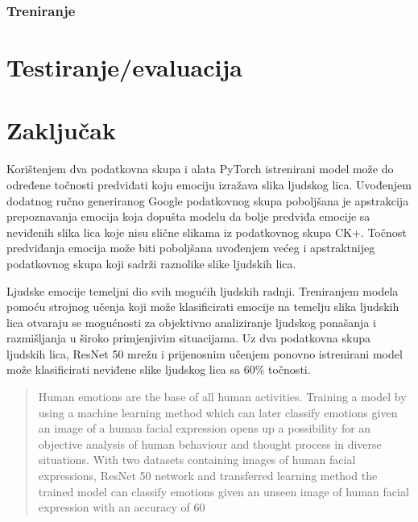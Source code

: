 \documentclass[times, utf8, zavrsni,numeric,pstricks]{fer}
\begin{document}
\subsection{Treniranje}

\chapter{Testiranje/evaluacija}

\chapter{Zaključak}
Korištenjem dva podatkovna skupa i alata PyTorch istrenirani model može do određene točnosti predviđati koju emociju izražava slika ljudskog lica. Uvođenjem dodatnog ručno generiranog Google podatkovnog skupa poboljšana je apstrakcija prepoznavanja emocija koja dopušta modelu da bolje predviđa emocije sa neviđenih slika lica koje nisu slične slikama iz podatkovnog skupa CK+. Točnost predviđanja emocija može biti poboljšana uvođenjem većeg i apstraktnijeg podatkovnog skupa koji sadrži raznolike slike ljudskih lica. 






\begin{sazetak}
Ljudske emocije temeljni dio svih mogućih ljudskih radnji. Treniranjem modela pomoću strojnog učenja koji može klasificirati emocije na temelju slika ljudskih lica otvaraju se mogućnosti za objektivno analiziranje ljudskog ponašanja i razmišljanja u široko primjenjivim situacijama. Uz dva podatkovna skupa ljudskih lica, ResNet 50 mrežu i prijenosnim učenjem ponovno istrenirani model može klasificirati neviđene slike ljudskog lica sa 60\% točnosti.

\end{sazetak}

\begin{abstract}
Human emotions are the base of all human activities. Training a model by using a machine learning method which can later classify emotions given an image of a human facial expression opens up a possibility for an objective analysis of human behaviour and thought process in diverse situations. With two datasets containing images of human facial expressions, ResNet 50 network and transferred learning method the trained model can classify emotions given an unseen image of human facial expression with an accuracy of 60%

\end{abstract}
\end{document}
